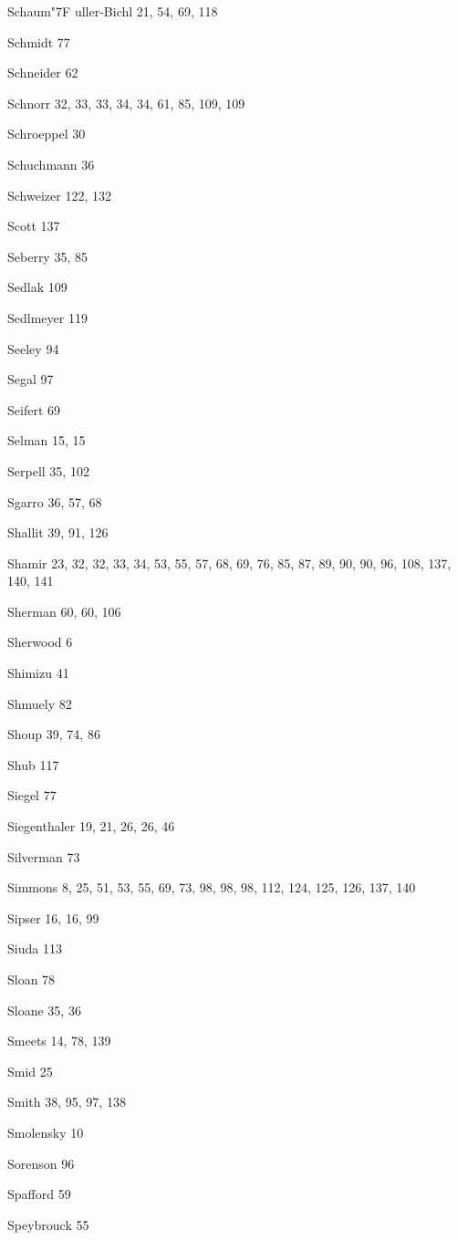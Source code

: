 \begin{theindex}
\item Schaum{\accent "7F u}ller-Bichl 21, 54, 69, 118
\item Schmidt 77
\item Schneider 62
\item Schnorr 32, 33, 33, 34, 34, 61, 85, 109, 109
\item Schroeppel 30
\item Schuchmann 36
\item Schweizer 122, 132
\item Scott 137
\item Seberry 35, 85
\item Sedlak 109
\item Sedlmeyer 119
\item Seeley 94
\item Segal 97
\item Seifert 69
\item Selman 15, 15
\item Serpell 35, 102
\item Sgarro 36, 57, 68
\item Shallit 39, 91, 126
\item Shamir 23, 32, 32, 33, 34, 53, 55, 57, 68, 69, 76, 85, 87, 89, 90, 90, 96, 108, 137, 140, 141
\item Sherman 60, 60, 106
\item Sherwood 6
\item Shimizu 41
\item Shmuely 82
\item Shoup 39, 74, 86
\item Shub 117
\item Siegel 77
\item Siegenthaler 19, 21, 26, 26, 46
\item Silverman 73
\item Simmons 8, 25, 51, 53, 55, 69, 73, 98, 98, 98, 112, 124, 125, 126, 137, 140
\item Sipser 16, 16, 99
\item Siuda 113
\item Sloan 78
\item Sloane 35, 36
\item Smeets 14, 78, 139
\item Smid 25
\item Smith 38, 95, 97, 138
\item Smolensky 10
\item Sorenson 96
\item Spafford 59
\item Speybrouck 55

\end{theindex}
